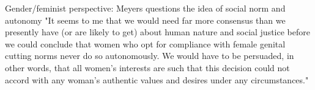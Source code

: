 \documentclass[12pt,]{article}
\begin{document}






Gender/feminist perspective:  \cite{Meye00} Meyers questions the idea of social norm and autonomy "It seems to me that we would need far more consensus than we presently have (or are likely to get) about human nature and social justice before we could conclude that women who opt for compliance with female genital cutting norms never do so autonomously.  We would have to be persuaded, in other words, that all women's interests are such that this decision could not accord with any woman's authentic values and desires under any circumstances." 
\end{document}
